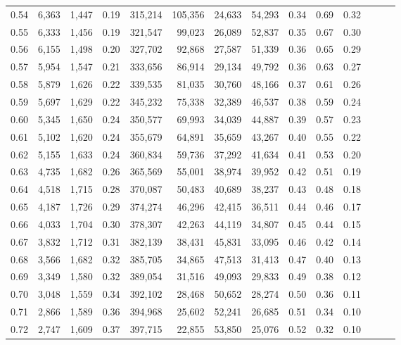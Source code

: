 \begin{tabular}{rrrrrrrrrrrrrr}
0.54 &  6,363 &  1,447 &  0.19 &  315,214 &  105,356 &  24,633 &  54,293 &  0.34 &  0.69 &      0.32 \\
0.55 &  6,333 &  1,456 &  0.19 &  321,547 &   99,023 &  26,089 &  52,837 &  0.35 &  0.67 &      0.30 \\
0.56 &  6,155 &  1,498 &  0.20 &  327,702 &   92,868 &  27,587 &  51,339 &  0.36 &  0.65 &      0.29 \\
0.57 &  5,954 &  1,547 &  0.21 &  333,656 &   86,914 &  29,134 &  49,792 &  0.36 &  0.63 &      0.27 \\
0.58 &  5,879 &  1,626 &  0.22 &  339,535 &   81,035 &  30,760 &  48,166 &  0.37 &  0.61 &      0.26 \\
0.59 &  5,697 &  1,629 &  0.22 &  345,232 &   75,338 &  32,389 &  46,537 &  0.38 &  0.59 &      0.24 \\
0.60 &  5,345 &  1,650 &  0.24 &  350,577 &   69,993 &  34,039 &  44,887 &  0.39 &  0.57 &      0.23 \\
0.61 &  5,102 &  1,620 &  0.24 &  355,679 &   64,891 &  35,659 &  43,267 &  0.40 &  0.55 &      0.22 \\
0.62 &  5,155 &  1,633 &  0.24 &  360,834 &   59,736 &  37,292 &  41,634 &  0.41 &  0.53 &      0.20 \\
0.63 &  4,735 &  1,682 &  0.26 &  365,569 &   55,001 &  38,974 &  39,952 &  0.42 &  0.51 &      0.19 \\
0.64 &  4,518 &  1,715 &  0.28 &  370,087 &   50,483 &  40,689 &  38,237 &  0.43 &  0.48 &      0.18 \\
0.65 &  4,187 &  1,726 &  0.29 &  374,274 &   46,296 &  42,415 &  36,511 &  0.44 &  0.46 &      0.17 \\
0.66 &  4,033 &  1,704 &  0.30 &  378,307 &   42,263 &  44,119 &  34,807 &  0.45 &  0.44 &      0.15 \\
0.67 &  3,832 &  1,712 &  0.31 &  382,139 &   38,431 &  45,831 &  33,095 &  0.46 &  0.42 &      0.14 \\
0.68 &  3,566 &  1,682 &  0.32 &  385,705 &   34,865 &  47,513 &  31,413 &  0.47 &  0.40 &      0.13 \\
0.69 &  3,349 &  1,580 &  0.32 &  389,054 &   31,516 &  49,093 &  29,833 &  0.49 &  0.38 &      0.12 \\
0.70 &  3,048 &  1,559 &  0.34 &  392,102 &   28,468 &  50,652 &  28,274 &  0.50 &  0.36 &      0.11 \\
0.71 &  2,866 &  1,589 &  0.36 &  394,968 &   25,602 &  52,241 &  26,685 &  0.51 &  0.34 &      0.10 \\
0.72 &  2,747 &  1,609 &  0.37 &  397,715 &   22,855 &  53,850 &  25,076 &  0.52 &  0.32 &      0.10 \\

\end{tabular}
